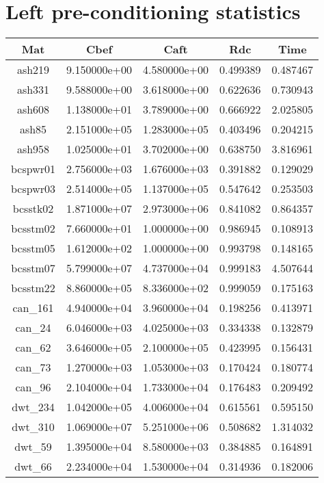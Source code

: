 \section{Left pre-conditioning statistics}

\begin{table}[h]
  \begin{tabular}{ccccc}
    \hline
    Mat & Cbef & Caft & Rdc & Time\\
    \hline
    ash219 & 9.150000e+00 & 4.580000e+00 & 0.499389 & 0.487467\\
    ash331 & 9.588000e+00 & 3.618000e+00 & 0.622636 & 0.730943\\
    ash608 & 1.138000e+01 & 3.789000e+00 & 0.666922 & 2.025805\\
    ash85 & 2.151000e+05 & 1.283000e+05 & 0.403496 & 0.204215\\
    ash958 & 1.025000e+01 & 3.702000e+00 & 0.638750 & 3.816961\\
    bcspwr01 & 2.756000e+03 & 1.676000e+03 & 0.391882 & 0.129029\\
    bcspwr03 & 2.514000e+05 & 1.137000e+05 & 0.547642 & 0.253503\\
    bcsstk02 & 1.871000e+07 & 2.973000e+06 & 0.841082 & 0.864357\\
    bcsstm02 & 7.660000e+01 & 1.000000e+00 & 0.986945 & 0.108913\\
    bcsstm05 & 1.612000e+02 & 1.000000e+00 & 0.993798 & 0.148165\\
    bcsstm07 & 5.799000e+07 & 4.737000e+04 & 0.999183 & 4.507644\\
    bcsstm22 & 8.860000e+05 & 8.336000e+02 & 0.999059 & 0.175163\\
    can\_161 & 4.940000e+04 & 3.960000e+04 & 0.198256 & 0.413971\\
    can\_24 & 6.046000e+03 & 4.025000e+03 & 0.334338 & 0.132879\\
    can\_62 & 3.646000e+05 & 2.100000e+05 & 0.423995 & 0.156431\\
    can\_73 & 1.270000e+03 & 1.053000e+03 & 0.170424 & 0.180774\\
    can\_96 & 2.104000e+04 & 1.733000e+04 & 0.176483 & 0.209492\\
    dwt\_234 & 1.042000e+05 & 4.006000e+04 & 0.615561 & 0.595150\\
    dwt\_310 & 1.069000e+07 & 5.251000e+06 & 0.508682 & 1.314032\\
    dwt\_59 & 1.395000e+04 & 8.580000e+03 & 0.384885 & 0.164891\\
    dwt\_66 & 2.234000e+04 & 1.530000e+04 & 0.314936 & 0.182006\\

\end{tabular}
\end{table}
